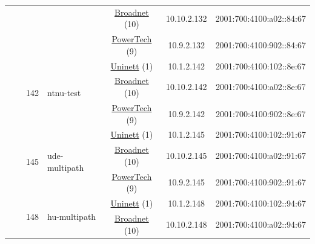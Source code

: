 \begin{small}
\begin{center}
\begin{longtable}{|c|c|c|c|c|c|c|c|}
  &  &  &  & \multicolumn{2}{|c|}{\tiny{\href{https://www.broadnet.no}{Broadnet} (10)}} & \tiny{10.10.2.132} & \tiny{2001:700:4100:a02::84:67} \\* \cline{5-5}\cline{6-6}\cline{7-7}\cline{8-8}
  &  &  &  & \multicolumn{2}{|c|}{\tiny{\href{http://www.powertech.no}{PowerTech} (9)}} & \tiny{10.9.2.132} & \tiny{2001:700:4100:902::84:67} \\* \cline{3-3}\cline{4-4}\cline{5-5}\cline{6-6}\cline{7-7}\cline{8-8}
  &  & \multirow{3}{*}{\tiny{142}} & \multicolumn{1}{|l|}{\multirow{3}{*}{\tiny{ntnu-test}}} & \multicolumn{2}{|c|}{\tiny{\href{https://www.uninett.no}{Uninett} (1)}} & \tiny{10.1.2.142} & \tiny{2001:700:4100:102::8e:67} \\* \cline{5-5}\cline{6-6}\cline{7-7}\cline{8-8}
  &  &  &  & \multicolumn{2}{|c|}{\tiny{\href{https://www.broadnet.no}{Broadnet} (10)}} & \tiny{10.10.2.142} & \tiny{2001:700:4100:a02::8e:67} \\* \cline{5-5}\cline{6-6}\cline{7-7}\cline{8-8}
  &  &  &  & \multicolumn{2}{|c|}{\tiny{\href{http://www.powertech.no}{PowerTech} (9)}} & \tiny{10.9.2.142} & \tiny{2001:700:4100:902::8e:67} \\* \cline{3-3}\cline{4-4}\cline{5-5}\cline{6-6}\cline{7-7}\cline{8-8}
  &  & \multirow{3}{*}{\tiny{145}} & \multicolumn{1}{|l|}{\multirow{3}{*}{\tiny{ude-multipath}}} & \multicolumn{2}{|c|}{\tiny{\href{https://www.uninett.no}{Uninett} (1)}} & \tiny{10.1.2.145} & \tiny{2001:700:4100:102::91:67} \\* \cline{5-5}\cline{6-6}\cline{7-7}\cline{8-8}
  &  &  &  & \multicolumn{2}{|c|}{\tiny{\href{https://www.broadnet.no}{Broadnet} (10)}} & \tiny{10.10.2.145} & \tiny{2001:700:4100:a02::91:67} \\* \cline{5-5}\cline{6-6}\cline{7-7}\cline{8-8}
  &  &  &  & \multicolumn{2}{|c|}{\tiny{\href{http://www.powertech.no}{PowerTech} (9)}} & \tiny{10.9.2.145} & \tiny{2001:700:4100:902::91:67} \\* \cline{3-3}\cline{4-4}\cline{5-5}\cline{6-6}\cline{7-7}\cline{8-8}
  &  & \multirow{3}{*}{\tiny{148}} & \multicolumn{1}{|l|}{\multirow{3}{*}{\tiny{hu-multipath}}} & \multicolumn{2}{|c|}{\tiny{\href{https://www.uninett.no}{Uninett} (1)}} & \tiny{10.1.2.148} & \tiny{2001:700:4100:102::94:67} \\* \cline{5-5}\cline{6-6}\cline{7-7}\cline{8-8}
  &  &  &  & \multicolumn{2}{|c|}{\tiny{\href{https://www.broadnet.no}{Broadnet} (10)}} & \tiny{10.10.2.148} & \tiny{2001:700:4100:a02::94:67} \\* \cline{5-5}\cline{6-6}\cline{7-7}\cline{8-8}

\end{longtable}
\end{center}
\end{small}
